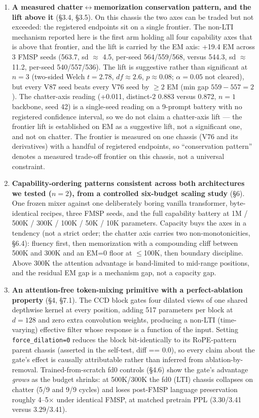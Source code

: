 \documentclass[11pt]{article}
\begin{document}
\begin{enumerate}
\item \textbf{A measured chatter$\leftrightarrow$memorization conservation pattern, and the lift above it} (\S3.4, \S3.5). On this chassis the two axes can be traded but not exceeded: the registered endpoints sit on a single frontier. The non-LTI mechanism reported here is the first arm holding all four capability axes that is above that frontier, and the lift is carried by the EM axis: +19.4 EM across 3 FMSP seeds (563.7, sd $\approx$ 4.5, per-seed 564/559/568, versus 544.3, sd $\approx$ 11.2, per-seed 540/557/536). The lift is suggestive rather than significant at $n = 3$ (two-sided Welch $t = 2.78$, $df \approx 2.6$, $p \approx 0.08$; $\alpha = 0.05$ not cleared), but every V87 seed beats every V76 seed by $\geq 2$ EM (min gap $559 - 557 = 2$). The chatter-axis reading (+0.011, distinct-2 0.883 versus 0.872, $n=1$ backbone, seed 42) is a single-seed reading on a 9-prompt battery with no registered confidence interval, so we do not claim a chatter-axis lift --- the frontier lift is established on EM as a suggestive lift, not a significant one, and not on chatter. The frontier is measured on one chassis (V76 and its derivatives) with a handful of registered endpoints, so ``conservation pattern'' denotes a measured trade-off frontier on this chassis, not a universal constraint.

\item \textbf{Capability-ordering patterns consistent across both architectures we tested ($n = 2$), from a controlled six-budget scaling study} (\S6). One frozen mixer against one deliberately boring vanilla transformer, byte-identical recipes, three FMSP seeds, and the full capability battery at 1M / 500K / 300K / 100K / 50K / 10K parameters. Capacity buys the axes in a tendency (not a strict order; the chatter axis carries two non-monotonicities, \S6.4): fluency first, then memorization with a compounding cliff between 500K and 300K and an EM=0 floor at $\leq$100K, then boundary discipline. Above 300K the attention advantage is band-limited to mid-range positions, and the residual EM gap is a mechanism gap, not a capacity gap.

\item \textbf{An attention-free token-mixing primitive with a perfect-ablation property} (\S4, \S7.1). The CCD block gates four dilated views of one shared depthwise kernel at every position, adding 517 parameters per block at $d=128$ and zero extra convolution weights, producing a non-LTI (time-varying) effective filter whose response is a function of the input. Setting \texttt{force\_dilation=0} reduces the block bit-identically to its RoPE-pattern parent chassis (asserted in the self-test, diff == 0.0), so every claim about the gate's effect is causally attributable rather than inferred from ablation-by-removal. Trained-from-scratch fd0 controls (\S4.6) show the gate's advantage \emph{grows} as the budget shrinks: at 500K/300K the fd0 (LTI) chassis collapses on chatter (5/9 and 9/9 cycles) and loses post-FMSP language preservation roughly 4--5$\times$ under identical FMSP, at matched pretrain PPL (3.30/3.41 versus 3.29/3.41).


\end{enumerate}
\end{document}

